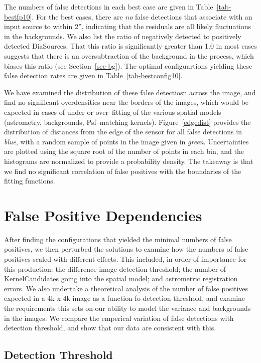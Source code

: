 \documentclass[prd, nofootinbib, floatfix, 11pt,tightenlines,times]{article}
\begin{document}
The numbers of false detections in each best case are given in
Table~\ref{tab-bestfp10}.  For the best cases, there are {\it no}
false detections that associate with an input source to within 2'',
indicating that the residuals are all likely fluctuations in the
backgrounds.  We also list the ratio of negatively detected to
positively detected DiaSources.  That this ratio is significantly
greater than 1.0 in most cases suggests that there is an
oversubtraction of the background in the process, which biases this
ratio (see Section~\ref{sec-bg}).  The optimal configuartions yielding
these false detection rates are given in Table~\ref{tab-bestconfig10}.

We have examined the distribution of these false detectiosn across the
image, and find no significant overdensities near the borders of the
images, which would be expected in cases of under or over--fitting of
the various spatial models (astrometry, backgrounds, Psf--matching
kernels).  Figure~\ref{edgedist} provides the distribution of
distances from the edge of the sensor for all false detections in {\it
  blue}, with a random sample of points in the image given in {\it
  green}.  Uncertainties are plotted using the square root of the
number of points in each bin, and the histograms are normalized to
provide a probability density.  The takeaway is that we find no
significant correlation of false positives with the boundaries of the
fitting functions.

\section{False Positive Dependencies}

After finding the configurations that yielded the minimal numbers of
false positives, we then perturbed the solutions to examine how the
numbers of false positives scaled with different effects.  This
included, in order of importance for this production: the difference
image detection threshold; the number of KernelCandidates going into
the spatial model; and astrometric registration errors.  We also
undertake a theoretical analysis of the number of false positives
expected in a 4k x 4k image as a function fo detection threshold, and
examine the requirements this sets on our ability to model the
variance and backgrounds in the images.  We compare the emperical
variation of false detections with detection threshold, and show that
our data are consistent with this.

\subsection{Detection Threshold}
\end{document}
